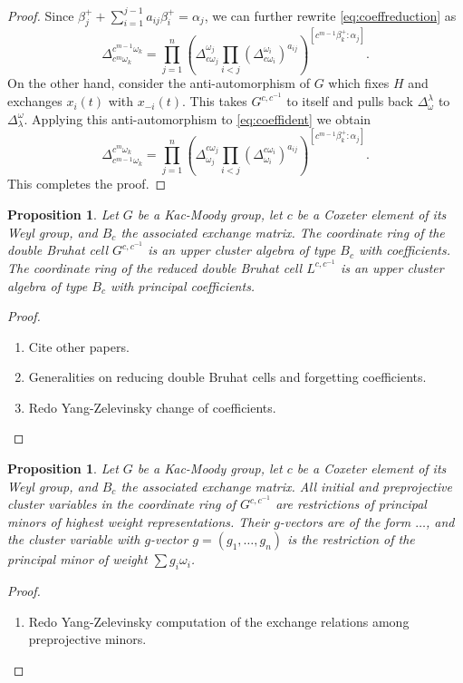 \documentclass[11pt]{amsart}
\newtheorem{proposition}[theorem]{Proposition}
\numberwithin{equation}{section}
\begin{document}
\begin{proof}
    Since $\beta_j^+ + \sum_{i=1}^{j-1} a_{ij} \beta_i^+ = \alpha_j$, we can further rewrite \cref{eq:coeffreduction} as
    \begin{equation}\label{eq:coeffident}
      \Delta_{c^m \omega_k}^{c^{m-1} \omega_k} = 
      \prod_{j=1}^n \left( \Delta_{c \omega_j}^{\omega_j} \prod_{i < j}(\Delta_{c \omega_i}^{\omega_i})^{a_{ij}}\right)^{[c^{m-1} \beta_k^+:\alpha_j]}. 
    \end{equation}
    On the other hand, consider the anti-automorphism of $G$ which fixes $H$ and exchanges $x_i(t)$ with $x_{-i}(t)$.  This takes $G^{c,c^{-1}}$ to itself and pulls back $\Delta_{\omega}^{\lambda}$ to $\Delta^{\omega}_{\lambda}$.  Applying this anti-automorphism to \cref{eq:coeffident} we obtain
    \[
      \Delta^{c^m \omega_k}_{c^{m-1} \omega_k} = 
      \prod_{j=1}^n \left( \Delta^{c \omega_j}_{\omega_j} \prod_{i < j}(\Delta^{c \omega_i}_{\omega_i})^{a_{ij}}\right)^{[c^{m-1} \beta_k^+:\alpha_j]}.
    \]
    This completes the proof.
  \end{proof}

\begin{proposition}
Let $G$ be a Kac-Moody group, let $c$ be a Coxeter element of its Weyl group, and $B_c$ the associated exchange matrix.  The coordinate ring of the double Bruhat cell $G^{c,c^{-1}}$ is an upper cluster algebra of type $B_c$ with coefficients.  The coordinate ring of the reduced double Bruhat cell $L^{c,c^{-1}}$ is an upper cluster algebra of type $B_c$ with principal coefficients.
\end{proposition}
\begin{proof}
\begin{enumerate}
\item Cite other papers.
\item Generalities on reducing double Bruhat cells and forgetting coefficients.
\item Redo Yang-Zelevinsky change of coefficients.
\end{enumerate}
\end{proof}

\begin{proposition}
Let $G$ be a Kac-Moody group, let $c$ be a Coxeter element of its Weyl group, and $B_c$ the associated exchange matrix.  All initial and preprojective cluster variables in the coordinate ring of $G^{c,c^{-1}}$ are restrictions of principal minors of highest weight representations.  Their $g$-vectors are of the form $\dotsc$, and the cluster variable with $g$-vector $g = (g_1,\dotsc,g_n)$ is the restriction of the principal minor of weight $\sum g_i \omega_i$.
\end{proposition}
\begin{proof}
\begin{enumerate}
\item Redo Yang-Zelevinsky computation of the exchange relations among preprojective minors.
\end{enumerate}
\end{proof}
\end{document}
